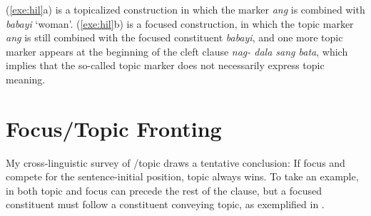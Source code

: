 \noindent (\ref{exe:hil}a) is a topicalized construction in which the
 marker \textit{ang} is combined with \textit{babayi}
`woman'. (\ref{exe:hil}b) is a focused construction, in which the
topic marker \textit{ang} is still combined with the focused
constituent \textit{babayi}, and one more topic marker appears at the
beginning of the cleft clause \textit{nag- dala sang bata}, which
implies that the so-called topic marker does not necessarily express
topic meaning.


\section{Focus/Topic Fronting}
\label{5:sec:fronting}



My cross-linguistic survey of /topic  draws a
tentative conclusion: If focus and  compete for the
sentence-initial position, topic always wins.  To take an example, in
 both topic and focus can precede the rest of the clause,
but a focused constituent must follow a constituent conveying topic,
as exemplified in .



